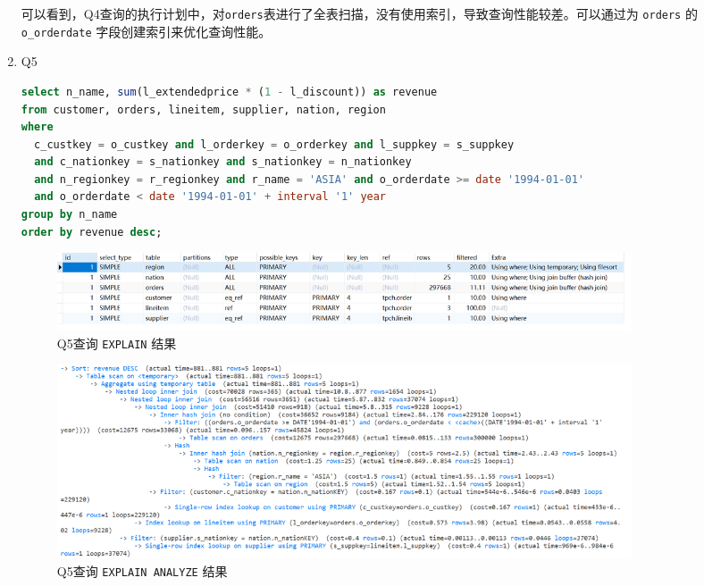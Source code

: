 \documentclass{article}
\renewcommand\tt{\texttt}
\begin{document}
\begin{enumerate}
可以看到，Q4查询的执行计划中，对\tt{orders}表进行了全表扫描，没有使用索引，导致查询性能较差。可以通过为 \tt{orders} 的 \tt{o\_orderdate} 字段创建索引来优化查询性能。

\item Q5

\begin{lstlisting}[language=sql]
select n_name, sum(l_extendedprice * (1 - l_discount)) as revenue 
from customer, orders, lineitem, supplier, nation, region 
where 
  c_custkey = o_custkey and l_orderkey = o_orderkey and l_suppkey = s_suppkey 
  and c_nationkey = s_nationkey and s_nationkey = n_nationkey 
  and n_regionkey = r_regionkey and r_name = 'ASIA' and o_orderdate >= date '1994-01-01' 
  and o_orderdate < date '1994-01-01' + interval '1' year 
group by n_name 
order by revenue desc;
\end{lstlisting}

\begin{figure}[H]
\centering
\includegraphics[width=0.85\textwidth]{img/9.png}
\caption{Q5查询 \tt{EXPLAIN} 结果}

\end{figure}

\begin{figure}[H]
\centering
\includegraphics[width=0.85\textwidth]{img/10.png}
\caption{Q5查询 \tt{EXPLAIN ANALYZE} 结果}
\end{figure}


\end{enumerate}
\end{document}
